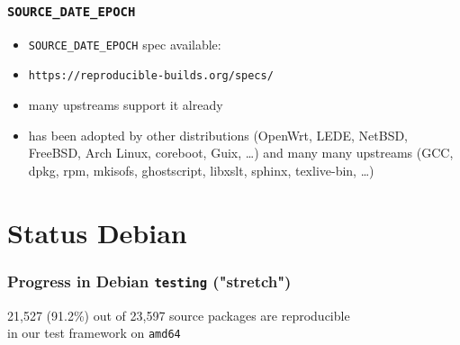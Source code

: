 \documentclass[14pt,aspectratio=169]{beamer}
\newif\ifplacelogo
\begin{document}
\begin{frame}
 \frametitle{\texttt{SOURCE\_DATE\_EPOCH}}

 \begin{itemize}
  \item \texttt{SOURCE\_DATE\_EPOCH} spec available:
  \item \texttt{https://reproducible-builds.org/specs/}
  \item many upstreams support it already
  \item has been adopted by other distributions
  (OpenWrt, LEDE, NetBSD, FreeBSD, Arch Linux, coreboot, Guix, …) and many many
  upstreams (GCC, dpkg, rpm, mkisofs, ghostscript, libxslt, sphinx,
  texlive-bin, …)
 \end{itemize}
\end{frame}


\placelogotrue

\section{Status Debian}

\begin{frame}
 \frametitle{Progress in Debian \texttt{testing} ("stretch")}
 \begin{center}
  \footnotesize{21,527 (91.2\%) out of 23,597 source packages are reproducible \\
    in our test framework on \texttt{amd64}}
  \vfill
 \end{center}
\end{frame}
\end{document}

